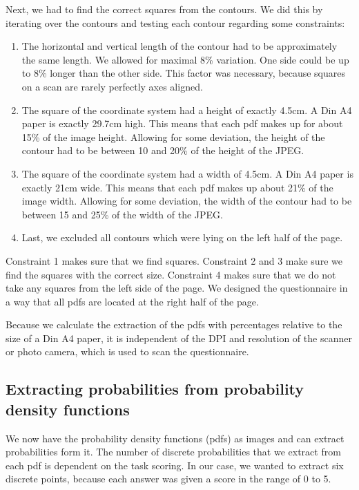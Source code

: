 \documentclass[../main/main.tex]{subfiles}
\begin{document}
	Next, we had to find the correct squares from the contours. We did this by iterating over the contours and testing each contour regarding some constraints:
	
	\begin{enumerate}
		\item The horizontal and vertical length of the contour had to be approximately the same length. We allowed for maximal 8\% variation. One side could be up to 8\% longer than the other side. This factor was necessary, because squares on a scan are rarely perfectly axes aligned.
		\item The square of the coordinate system had a height of exactly 4.5cm. A Din A4 paper is exactly 29.7cm high. This means that each pdf makes up for about 15\% of the image height. Allowing for some deviation, the height of the contour had to be between 10 and 20\% of the height of the JPEG. 
		\item The square of the coordinate system had a width of 4.5cm. A Din A4 paper is exactly 21cm wide. This means that each pdf makes up about 21\% of the image width. Allowing for some deviation, the width of the contour had to be between 15 and 25\% of the width of the JPEG. 
		\item Last, we excluded all contours which were lying on the left half of the page.
	\end{enumerate}

	\noindent Constraint 1 makes sure that we find squares. Constraint 2 and 3 make sure we find the squares with the correct size. Constraint 4 makes sure that we do not take any squares from the left side of the page. We designed the questionnaire in a way that all pdfs are located at the right half of the page.
	
	Because we calculate the extraction of the pdfs with percentages relative to the size of a Din A4 paper, it is independent of the DPI and resolution of the scanner or photo camera, which is used to scan the questionnaire.
	
	\subsection{Extracting probabilities from probability density functions}
	
	We now have the probability density functions (pdfs) as images and can extract probabilities form it. The number of discrete probabilities that we extract from each pdf is dependent on the task scoring. In our case, we wanted to extract six discrete points, because each answer was given a score in the range of 0 to 5. 
	
\end{document}

